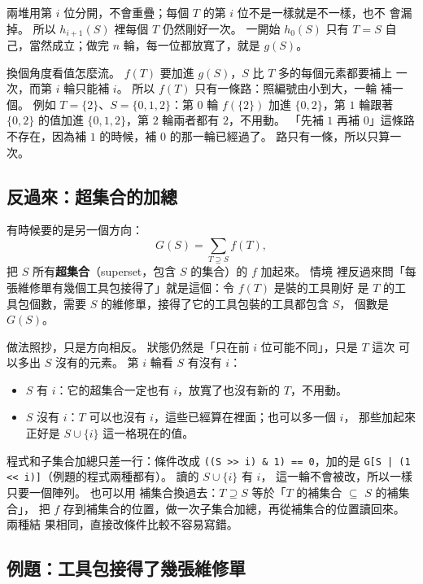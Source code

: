 兩堆用第 $i$ 位分開，不會重疊；每個 $T$ 的第 $i$ 位不是一樣就是不一樣，也不
會漏掉。 所以 $h_{i+1}(S)$ 裡每個 $T$ 仍然剛好一次。 一開始 $h_0(S)$ 只有
$T = S$ 自己，當然成立；做完 $n$ 輪，每一位都放寬了，就是 $g(S)$。

換個角度看值怎麼流。 $f(T)$ 要加進 $g(S)$，$S$ 比 $T$ 多的每個元素都要補上
一次，而第 $i$ 輪只能補 $i$。 所以 $f(T)$ 只有一條路：照編號由小到大，一輪
補一個。 例如 $T = \{2\}$、$S = \{0, 1, 2\}$：第 $0$ 輪 $f(\{2\})$ 加進
$\{0, 2\}$，第 $1$ 輪跟著 $\{0, 2\}$ 的值加進 $\{0, 1, 2\}$，第 $2$ 輪兩者都有
$2$，不用動。 「先補 $1$ 再補 $0$」這條路不存在，因為補 $1$ 的時候，補 $0$
的那一輪已經過了。 路只有一條，所以只算一次。

\subsection{反過來：超集合的加總}
\label{sec:bm-sos-super}

有時候要的是另一個方向：
\[
G(S) = \sum_{T \supseteq S} f(T),
\]
把 $S$ 所有\textbf{超集合}（superset，包含 $S$ 的集合）的 $f$ 加起來。 情境
裡反過來問「每張維修單有幾個工具包接得了」就是這個：令 $f(T)$ 是裝的工具剛好
是 $T$ 的工具包個數，需要 $S$ 的維修單，接得了它的工具包裝的工具都包含 $S$，
個數是 $G(S)$。

做法照抄，只是方向相反。 狀態仍然是「只在前 $i$ 位可能不同」，只是 $T$ 這次
可以多出 $S$ 沒有的元素。 第 $i$ 輪看 $S$ 有沒有 $i$：

\begin{itemize}
\item $S$ 有 $i$：它的超集合一定也有 $i$，放寬了也沒有新的 $T$，不用動。
\item $S$ 沒有 $i$：$T$ 可以也沒有 $i$，這些已經算在裡面；也可以多一個 $i$，
那些加起來正好是 $S \cup \{i\}$ 這一格現在的值。
\end{itemize}

程式和子集合加總只差一行：條件改成 \texttt{((S >> i) \& 1) == 0}，加的是
\texttt{G[S | (1 << i)]}（例題的程式兩種都有）。 讀的 $S \cup \{i\}$ 有 $i$，
這一輪不會被改，所以一樣只要一個陣列。 也可以用
補集合換過去：$T \supseteq S$ 等於「$T$ 的補集合 $\subseteq$ $S$ 的補集合」，
把 $f$ 存到補集合的位置，做一次子集合加總，再從補集合的位置讀回來。 兩種結
果相同，直接改條件比較不容易寫錯。

\subsection{例題：工具包接得了幾張維修單}
\label{sec:ex-bm-sos}

